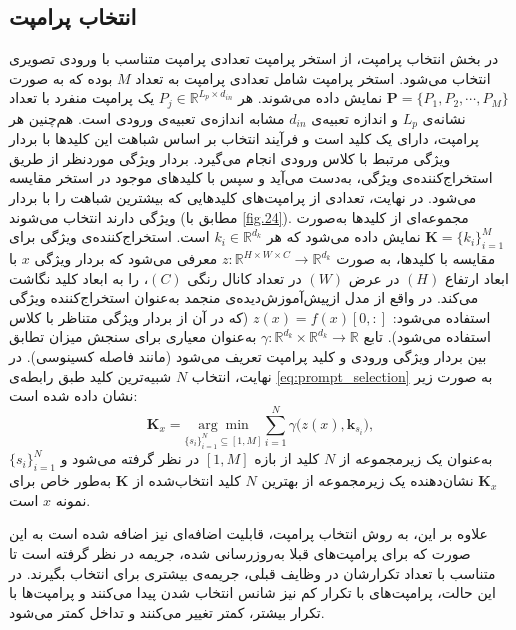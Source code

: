 \subsection{انتخاب پرامپت}
در بخش انتخاب پرامپت، از استخر پرامپت تعدادی پرامپت متناسب با ورودی تصویری انتخاب می‌شود. استخر پرامپت شامل تعدادی پرامپت به تعداد $M$ بوده که به صورت \(\mathbf{P} = \{ P_{1}, P_{2}, \cdots, P_{M} \}\) نمایش داده‌ می‌شوند. هر \( P_j \in \mathbb{R}^{L_p \times d_{in}} \) یک پرامپت منفرد با تعداد نشانه‌ی \( L_p \) و اندازه تعبیه‌ی 
$d_{in}$  مشابه اندازه‌ی تعبیه‌ی ورودی است. هم‌چنین هر پرامپت، دارای یک کلید است و فرآیند انتخاب بر اساس شباهت این کلیدها با بردار ویژگی مرتبط با کلاس ورودی انجام می‌گیرد. بردار ویژگی موردنظر از طریق استخراج‌کننده‌ی ویژگی، به‌دست می‌آید و سپس با کلیدهای موجود در استخر مقایسه می‌شود. در نهایت، تعدادی از پرامپت‌های کلیدهایی که بیشترین شباهت را با بردار ویژگی دارند انتخاب می‌شوند (مطابق با \cref{fig.24}). مجموعه‌ای از کلیدها به‌صورت 
\(\mathbf{K} = \{k_{i}\}_{i=1}^{M}\) 
نمایش داده می‌شود که هر \(k_i \in \mathbb{R}^{d_k}\) است. استخراج‌کننده‌ی ویژگی برای مقایسه با کلیدها، به صورت  \( z : \mathbb{R}^{H \times W \times C} \to \mathbb{R}^{d_k} \) معرفی می‌شود که بردار ویژگی \(x\) با ابعاد ارتفاع 
$(H)$ در 
عرض 
$(W)$ در
تعداد کانال رنگی $(C)$، را به ابعاد کلید نگاشت می‌کند. در واقع از مدل ازپیش‌آموزش‌دیده‌ی منجمد به‌عنوان استخراج‌کننده ویژگی  استفاده می‌شود:
\( z(x) = f(x)[0,:] \)
(که در آن از بردار ویژگی متناظر با کلاس استفاده می‌شود). 
تابع \(\gamma : \mathbb{R}^{d_k} \times \mathbb{R}^{d_k} \to \mathbb{R}\) به‌عنوان معیاری برای سنجش میزان تطابق بین بردار ویژگی ورودی و کلید پرامپت تعریف می‌شود (مانند فاصله کسینوسی). در نهایت، انتخاب $N$ شبیه‌ترین کلید طبق رابطه‌ی \eqref{eq:prompt_selection} به صورت زیر نشان داده شده است:
\begin{equation}\label{eq:prompt_selection}
	\mathbf{K}_x = 
	\underset{\{s_i\}_{i=1}^{N} \subseteq [1, M]}{\arg\min} 
	\sum_{i=1}^{N} \gamma \big( z(x), \mathbf{k}_{s_i} \big),
\end{equation}
\(\{s_i\}_{i=1}^{N}\) به‌عنوان یک زیرمجموعه از \(N\) کلید از بازه \([1, M]\) در نظر گرفته می‌شود
و \( \mathbf{K}_x \) نشان‌دهنده یک زیرمجموعه از بهترین \( N \) کلید انتخاب‌شده از \( \mathbf{K} \) به‌طور خاص برای نمونه \( x \) است.

علاوه بر این، به روش انتخاب پرامپت، قابلیت اضافه‌ای نیز اضافه شده است به این صورت که برای پرامپت‌های قبلا به‌روزرسانی شده، جریمه در نظر گرفته است تا متناسب با تعداد تکرارشان در وظایف قبلی، جریمه‌ی بیشتری برای انتخاب بگیرند. در این حالت، پرامپت‌های با تکرار کم نیز شانس انتخاب شدن پیدا می‌کنند و پرامپت‌ها با تکرار بیشتر، کمتر تغییر می‌کنند و تداخل کمتر می‌شود.
